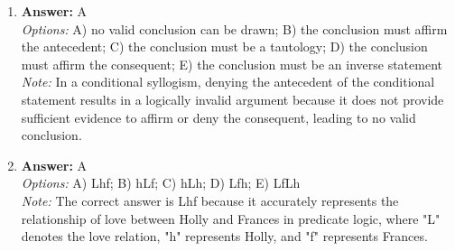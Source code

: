 \documentclass[12pt]{article}
\begin{document}
\begin{enumerate}[label=\arabic*.]
\item \textbf{Answer:} A
\\ \textit{Options:} A) no valid conclusion can be drawn; B) the conclusion must affirm the antecedent; C) the conclusion must be a tautology; D) the conclusion must affirm the consequent; E) the conclusion must be an inverse statement
\\ \textit{Note:} In a conditional syllogism, denying the antecedent of the conditional statement results in a logically invalid argument because it does not provide sufficient evidence to affirm or deny the consequent, leading to no valid conclusion.
\item \textbf{Answer:} A
\\ \textit{Options:} A) Lhf; B) hLf; C) hLh; D) Lfh; E) LfLh
\\ \textit{Note:} The correct answer is Lhf because it accurately represents the relationship of love between Holly and Frances in predicate logic, where "L" denotes the love relation, "h" represents Holly, and "f" represents Frances.
\end{enumerate}
\end{document}
